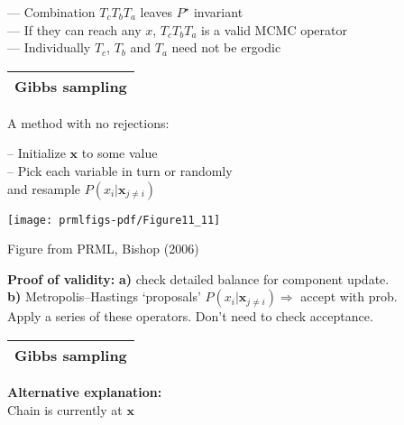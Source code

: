 \documentclass[25pt,landscape]{foils}
\newcommand{\Gray}{\textcolor{mygray}}
\newcommand{\Green}{\textcolor{mypine}}
\newcommand{\myfoilhead}[1]{
\newpage
\vspace*{-1cm}
\Gray{
\begin{tabular*}{\textwidth}{l}
{\bf \Huge #1} \\
\bottomrule
\end{tabular*}}}
\newcommand{\bx}{\mathbf{x}}
\begin{document}
\vfill
\hspace*{1cm}--- Combination $T_cT_bT_a$ leaves $P^\star$ invariant\\[0.3cm]
\hspace*{1cm}--- If they can reach any $x$, $T_cT_bT_a$ is a valid MCMC operator\\[0.3cm]
\hspace*{1cm}--- Individually $T_c$, $T_b$ and $T_a$ need not be ergodic
\vfill

\myfoilhead{Gibbs sampling}

\vfill

\begin{minipage}{0.6\linewidth}
A method with no rejections:

\bigskip

\hspace*{1cm}-- Initialize $\bx$ to some value\\
\hspace*{1cm}-- Pick each variable in turn or randomly\\
\hspace*{1cm}\phantom{--} and resample $P(x_i|\bx_{j\neq i})$
\end{minipage}
\begin{minipage}{0.39\linewidth}
    \vspace*{1cm}
    \texttt{[image: prmlfigs-pdf/Figure11\_11]}\\[-1cm]
    \begin{flushright}
    \Gray{\tiny Figure from PRML, Bishop (2006)}
    \end{flushright}
\end{minipage}

\vfill
\vfill
\Green{\bf Proof of validity:} \textbf{a)} check detailed balance for component update.\\
\textbf{b)} Metropolis--Hastings `proposals' $P(x_i|\bx_{j\neq i})\Rightarrow$ accept with prob. \\
Apply a series of these operators. Don't need to check acceptance.

\myfoilhead{Gibbs sampling}

\vfill
\Green{\bf Alternative explanation:}\\

Chain is currently at $\bx$\\
\end{document}
